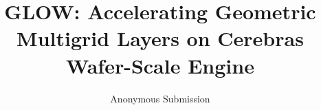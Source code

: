 \documentclass[sigconf]{acmart}
\begin{document}
\title{GLOW: Accelerating Geometric Multigrid Layers on Cerebras Wafer-Scale Engine}
\author{Anonymous Submission}










\end{document}

